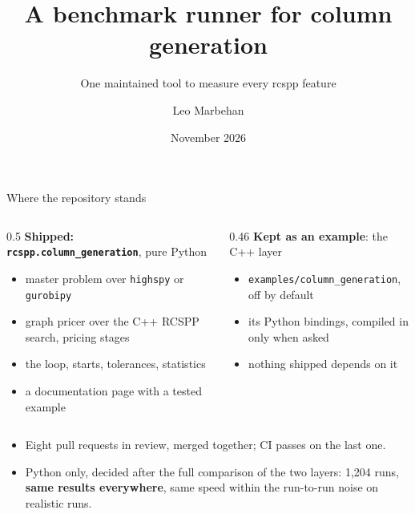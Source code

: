 \documentclass[aspectratio=169]{beamer}
\title{A benchmark runner for column generation}
\subtitle{One maintained tool to measure every rcspp feature}
\author{Leo Marbehan}
\date{November 2026}
\begin{document}
\begin{frame}[plain]
  \titlepage
\end{frame}

\begin{frame}{Where the repository stands}
  \begin{columns}[T]
    \begin{column}{0.5\textwidth}
      \textbf{Shipped: \texttt{rcspp.column\_generation}}, pure Python
      \begin{itemize}\small
        \item master problem over \texttt{highspy} or \texttt{gurobipy}
        \item graph pricer over the C++ RCSPP search, pricing stages
        \item the loop, starts, tolerances, statistics
        \item a documentation page with a tested example
      \end{itemize}
    \end{column}
    \begin{column}{0.46\textwidth}
      \textbf{Kept as an example}: the C++ layer
      \begin{itemize}\small
        \item \texttt{examples/column\_generation}, off by default
        \item its Python bindings, compiled in only when asked
        \item nothing shipped depends on it
      \end{itemize}
    \end{column}
  \end{columns}

  \vspace{0.6em}
  \begin{itemize}\small
    \item Eight pull requests in review, merged together; CI passes on the last one.
    \item Python only, decided after the full comparison of the two layers: 1,204 runs, \textbf{same results
      everywhere}, same speed within the run-to-run noise on realistic runs.
  \end{itemize}
\end{frame}
\end{document}
